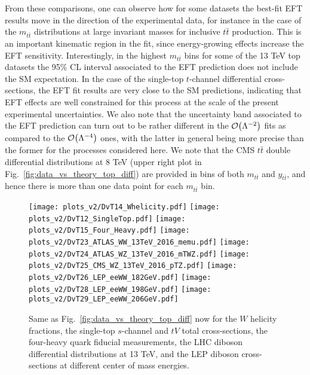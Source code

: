 From these comparisons, one can observe how for some datasets the best-fit EFT results
move in the direction of the experimental data, for instance in the case of the $m_{t\bar{t}}$
distributions at large invariant masses for inclusive $t\bar{t}$ production.
%
This is an important kinematic region in the fit, since energy-growing effects increase the EFT
sensitivity.
%
Interestingly, in the highest $m_{t\bar{t}}$ bins for some of the 13 TeV top datasets
the 95\% CL interval associated to the EFT prediction does not include the SM expectation.
%
In the case of the single-top $t$-channel differential cross-sections, the EFT fit results
are very close to the SM predictions, indicating that EFT effects are well constrained
for this process at the scale of the present experimental uncertainties.
%
We also note that the uncertainty band associated to the EFT prediction
can turn out to be rather different in the $\mathcal{O}\lp \Lambda^{-2}\rp$ fits
as compared to the $\mathcal{O}\lp \Lambda^{-4}\rp$ ones, with the latter in general
being more precise than the former for the processes considered here.
%
{  We note that the CMS $t\bar{t}$ double differential distributions at 8 TeV
  (upper right plot in Fig.~\ref{fig:data_vs_theory_top_diff}) are provided in bins
  of both $m_{t\bar{t}}$ and $y_{t\bar{t}}$, and hence there is more than one data point
for each $m_{t\bar{t}}$ bin.}

\begin{figure}[t]
  \begin{center}
    \texttt{[image: plots\_v2/DvT14\_Whelicity.pdf]}
  \texttt{[image: plots\_v2/DvT12\_SingleTop.pdf]}
  \texttt{[image: plots\_v2/DvT15\_Four\_Heavy.pdf]}
  \texttt{[image: plots\_v2/DvT23\_ATLAS\_WW\_13TeV\_2016\_memu.pdf]}
  \texttt{[image: plots\_v2/DvT24\_ATLAS\_WZ\_13TeV\_2016\_mTWZ.pdf]}
  \texttt{[image: plots\_v2/DvT25\_CMS\_WZ\_13TeV\_2016\_pTZ.pdf]}
  \texttt{[image: plots\_v2/DvT26\_LEP\_eeWW\_182GeV.pdf]}
  \texttt{[image: plots\_v2/DvT28\_LEP\_eeWW\_198GeV.pdf]}
  \texttt{[image: plots\_v2/DvT29\_LEP\_eeWW\_206GeV.pdf]}
  \caption{\small Same as Fig.~\ref{fig:data_vs_theory_top_diff} now for the $W$ helicity fractions,
    the single-top $s$-channel and $tV$ total cross-sections, the four-heavy quark fiducial
    measurements, the LHC diboson differential distributions at 13 TeV, and the LEP diboson cross-sections
    at different center of mass energies.
 \label{fig:data_vs_theory_v2} }
 \end{center}
\end{figure}

